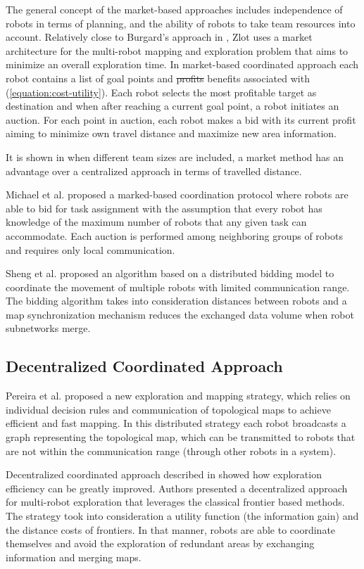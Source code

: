 The general concept of the market-based approaches includes independence of robots in terms of planning, and the ability of robots to take team resources into account.
Relatively close to Burgard's approach in \cite{Burgard2000}, Zlot \cite{Zlot2002} uses a market architecture for the multi-robot mapping and exploration problem that aims to minimize an overall exploration time. In market-based coordinated approach each robot contains a list of goal points and \st{profits} {\color{red}benefits} associated with (\ref{equation:cost-utility}). Each robot selects the most profitable target as destination and when after reaching a current goal point, a robot initiates an auction. For each point in auction, each robot makes a bid with its current profit aiming to minimize own travel distance and maximize new area information.

It is shown in \cite{Dias2003} when different team sizes are included, a market method has an advantage over a centralized approach in terms of travelled distance. 

Michael et al. \cite{Michael2008} proposed a marked-based coordination protocol where robots are able to bid for task assignment with the assumption that every robot has knowledge of the maximum number of robots that any given task can accommodate. Each auction is performed among neighboring groups of robots and requires only local communication.

Sheng et al. \cite{Sheng2006} proposed an algorithm based on a distributed bidding model to coordinate the movement of multiple robots with limited communication range. The bidding algorithm takes into consideration distances between robots and a map synchronization mechanism reduces the exchanged data volume when robot subnetworks merge.

\subsection{Decentralized Coordinated Approach}

Pereira et al. \cite{Pereira2015} proposed a new exploration and mapping strategy, which relies on individual decision rules and communication of topological maps to achieve efficient and fast mapping. In this distributed strategy each robot broadcasts a graph representing the topological map, which can be transmitted to robots that are not within the communication range (through other robots in a system). 

Decentralized coordinated approach described in \cite{Colares2016} showed how exploration efficiency can be greatly improved. Authors presented a decentralized approach for multi-robot exploration that leverages the classical frontier based methods. The strategy took into consideration a utility function (the information gain) and the distance costs of frontiers. In that manner, robots are able to coordinate themselves and avoid the exploration of redundant areas by exchanging information and merging maps.

